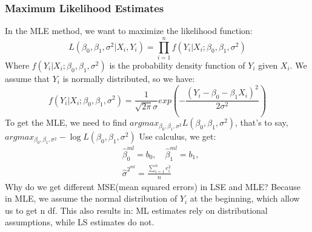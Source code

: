 \documentclass[main]{subfiles}
\begin{document}
\subsubsection{Maximum Likelihood Estimates}
In the MLE method, we want to maximize the likelihood function:
$$ L(\beta_0,\beta_1,\sigma ^{2} | X_i,Y_i) = \prod_{i=1}^{n}f(Y_i|X_i;\beta_0,\beta_1,\sigma ^{2}) $$
Where $f(Y_i|X_i;\beta_0,\beta_1,\sigma ^{2})$ is the probability density function of $Y_i$ given $X_i$. We assume that $Y_i$ is normally distributed, so we have:
$$ f(Y_i|X_i;\beta_0,\beta_1,\sigma ^{2}) = \frac{1}{\sqrt{2\pi}\sigma}exp\left(-\frac{(Y_i-\beta_0-\beta_1X_i)^2}{2\sigma^2}\right) $$
To get the MLE, we need to find $argmax_{\beta_0, \beta_1, \sigma ^{2}} L(\beta_0, \beta_1, \sigma ^{2})$, that's to say, $argmax_{\beta_0, \beta_1, \sigma ^{2}}-\log L(\beta_0,\beta_1,\sigma^2)$
Use calculus, we get:
\begin{align*}
    &\hat{\beta}_0^{ml}=b_0, \quad \hat{\beta}_1^{ml}=b_1, \\
    &\hat{\sigma}^{2^{ml}}=\frac{\sum_{i=1}^{n}e_i^2}{n}
\end{align*}
Why do we get different MSE(mean squared errors) in LSE and MLE? Because in MLE, we assume the normal distribution of $Y_i$ at the beginning, which allow us to get n df. This also results in: ML estimates rely on distributional assumptions, while LS estimates do not.
\end{document}
